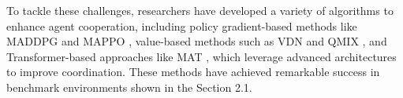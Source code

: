 To tackle these challenges, researchers have developed a variety of algorithms to enhance agent cooperation, including policy gradient-based methods like MADDPG \cite{lowe2017multi} and MAPPO \cite{yu2022surprising}, value-based methods such as VDN \cite{sunehag2017value} and QMIX \cite{rashid2020monotonic}, and Transformer-based approaches like MAT \cite{wen2022multi}, which leverage advanced architectures to improve coordination. These methods have achieved remarkable success in benchmark environments shown in the Section 2.1. 
